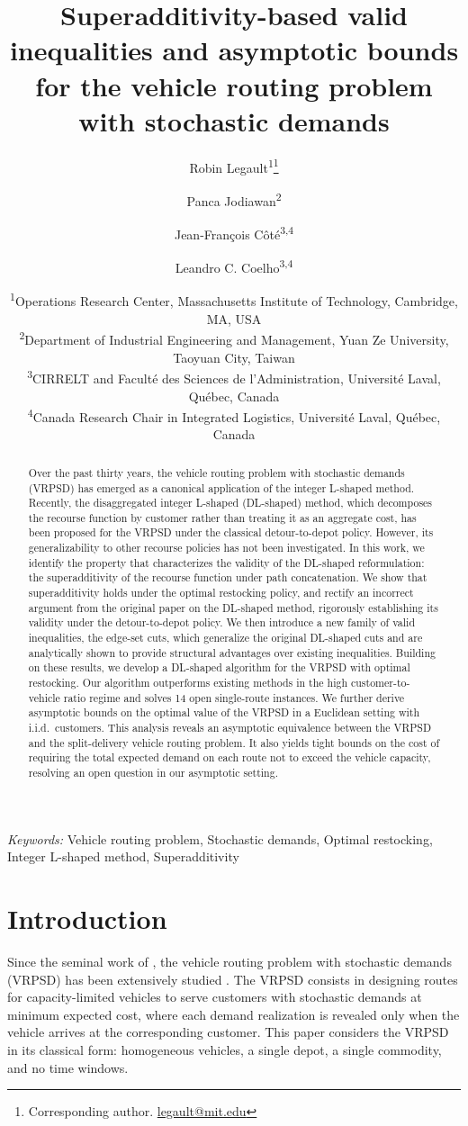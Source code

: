 \documentclass{article}
\title{Superadditivity-based valid inequalities and asymptotic bounds for the vehicle routing problem with stochastic demands}
\author{
Robin Legault\textsuperscript{1}\thanks{Corresponding author. \href{mailto:legault@mit.edu}{legault@mit.edu}} \and
Panca Jodiawan\textsuperscript{2} \and
Jean-François Côté\textsuperscript{3,4} \and
Leandro C. Coelho\textsuperscript{3,4}
}
\date{
\normalsize{
\textsuperscript{1}Operations Research Center, Massachusetts Institute of Technology, Cambridge, MA, USA\\
\textsuperscript{2}Department of Industrial Engineering and Management, Yuan Ze University, Taoyuan City, Taiwan\\
\textsuperscript{3}CIRRELT and Faculté des Sciences de l’Administration, Université Laval, Québec, Canada\\
\textsuperscript{4}Canada Research Chair in Integrated Logistics, Université Laval, Québec, Canada
}
}
\newcommand{\rev}[1]{{\color{black}#1}}
\begin{document}
\maketitle


\begin{abstract}
Over the past thirty years, the vehicle routing problem with stochastic demands (VRPSD) has emerged as a canonical application of the integer L-shaped method. Recently, the disaggregated integer L-shaped (DL-shaped) method, which decomposes the recourse function by customer rather than treating it as an aggregate cost, has been proposed for the VRPSD under the classical detour-to-depot policy. However, its generalizability to other recourse policies has not been investigated. In this work, we identify the property that characterizes the validity of the DL-shaped reformulation: the superadditivity of the recourse function under path concatenation. We show that superadditivity holds under the optimal restocking policy, and rectify an incorrect argument from the original paper on the DL-shaped method, rigorously establishing its validity under the detour-to-depot policy. We then introduce a new family of valid inequalities, \rev{the edge-set cuts, which generalize the original DL-shaped cuts and are analytically shown to provide structural advantages over existing inequalities}. Building on these results, we develop a DL-shaped algorithm for the VRPSD with optimal restocking. Our algorithm outperforms existing methods in the high customer-to-vehicle ratio regime and solves 14 open single-route instances. \rev{We further derive asymptotic bounds on the optimal value of the VRPSD in a Euclidean setting with i.i.d.\ customers. This analysis reveals an asymptotic equivalence between the VRPSD and the split-delivery vehicle routing problem. It also yields tight bounds on the cost of requiring the total expected demand on each route not to exceed the vehicle capacity, resolving an open question in our asymptotic setting.}
\end{abstract}

\textit{Keywords: } Vehicle routing problem, Stochastic demands, Optimal restocking, Integer L-shaped method, Superadditivity

\section{Introduction} \label{sec:Intro}

Since the seminal work of \cite{tillman1969multiple}, the vehicle routing problem with stochastic demands (VRPSD) has been extensively studied \cite{oyola2017stochastic, oyola2018stochastic}. \rev{The VRPSD consists in designing routes for capacity-limited vehicles to serve customers with stochastic demands at minimum expected cost, where each demand realization is revealed only when the vehicle arrives at the corresponding customer. This paper considers the VRPSD in its classical form: homogeneous vehicles, a single depot, a single commodity, and no time windows.}
\end{document}
